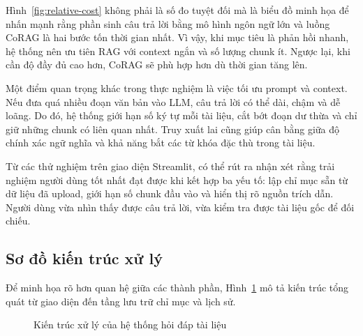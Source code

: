 \documentclass[10pt, conference, a4paper]{IEEEtran}
\begin{document}
Hình~\ref{fig:relative-cost} không phải là số đo tuyệt đối mà là biểu đồ minh họa để nhấn mạnh rằng phần sinh câu trả lời bằng mô hình ngôn ngữ lớn và luồng CoRAG là hai bước tốn thời gian nhất. Vì vậy, khi mục tiêu là phản hồi nhanh, hệ thống nên ưu tiên RAG với context ngắn và số lượng chunk ít. Ngược lại, khi cần độ đầy đủ cao hơn, CoRAG sẽ phù hợp hơn dù thời gian tăng lên.

Một điểm quan trọng khác trong thực nghiệm là việc tối ưu prompt và context. Nếu đưa quá nhiều đoạn văn bản vào LLM, câu trả lời có thể dài, chậm và dễ loãng. Do đó, hệ thống giới hạn số ký tự mỗi tài liệu, cắt bớt đoạn dư thừa và chỉ giữ những chunk có liên quan nhất. Truy xuất lai cũng giúp cân bằng giữa độ chính xác ngữ nghĩa và khả năng bắt các từ khóa đặc thù trong tài liệu.

Từ các thử nghiệm trên giao diện Streamlit, có thể rút ra nhận xét rằng trải nghiệm người dùng tốt nhất đạt được khi kết hợp ba yếu tố: lập chỉ mục sẵn từ dữ liệu đã upload, giới hạn số chunk đầu vào và hiển thị rõ nguồn trích dẫn. Người dùng vừa nhìn thấy được câu trả lời, vừa kiểm tra được tài liệu gốc để đối chiếu.

\subsection{Sơ đồ kiến trúc xử lý}
Để minh họa rõ hơn quan hệ giữa các thành phần, Hình~\ref{fig:architecture} mô tả kiến trúc tổng quát từ giao diện đến tầng lưu trữ chỉ mục và lịch sử.

\begin{figure}[H]
\centering
{}
\caption{Kiến trúc xử lý của hệ thống hỏi đáp tài liệu}
\label{fig:architecture}
\end{figure}
\end{document}
